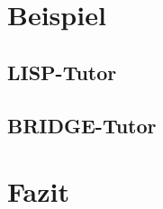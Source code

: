 \documentclass{beamer}
\begin{document}
\section{Beispiel}
\subsection{LISP-Tutor}
\subsection{BRIDGE-Tutor}

\section{Fazit}
\end{document}
